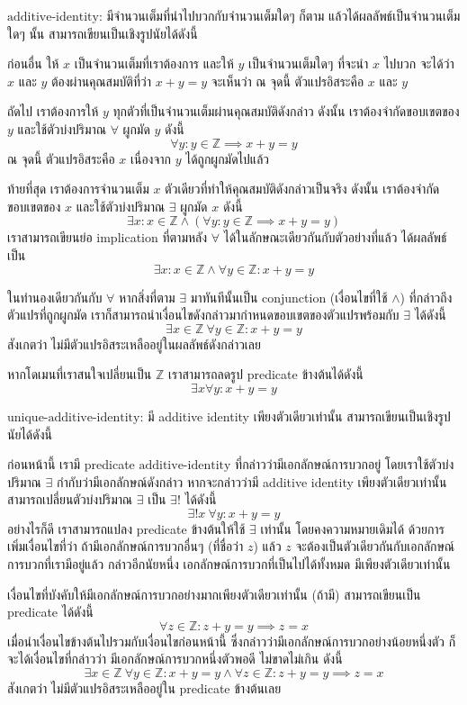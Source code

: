 \begin{example}
$\textrm{additive-identity}$: มีจำนวนเต็มที่นำไปบวกกับจำนวนเต็มใดๆ ก็ตาม แล้วได้ผลลัพธ์เป็นจำนวนเต็มใดๆ นั้น สามารถเขียนเป็นเชิงรูปนัยได้ดังนี้

ก่อนอื่น ให้ $x$ เป็นจำนวนเต็มที่เราต้องการ และให้ $y$ เป็นจำนวนเต็มใดๆ ที่จะนำ $x$ ไปบวก \enskip จะได้ว่า $x$ และ $y$ ต้องผ่านคุณสมบัติที่ว่า $x+y=y$ \enskip จะเห็นว่า ณ จุดนี้ ตัวแปรอิสระคือ $x$ และ $y$

ถัดไป เราต้องการให้ $y$ ทุกตัวที่เป็นจำนวนเต็มผ่านคุณสมบัติดังกล่าว \enskip ดังนั้น เราต้องจำกัดขอบเขตของ $y$ และใช้ตัวบ่งปริมาณ $\forall$ ผูกมัด $y$ ดังนี้ \[\forall y: y\in\mathbb{Z}\implies x+y=y\] ณ จุดนี้ ตัวแปรอิสระคือ $x$ เนื่องจาก $y$ ได้ถูกผูกมัดไปแล้ว

ท้ายที่สุด เราต้องการจำนวนเต็ม $x$ ตัวเดียวที่ทำให้คุณสมบัติดังกล่าวเป็นจริง \enskip ดังนั้น เราต้องจำกัดขอบเขตของ $x$ และใช้ตัวบ่งปริมาณ $\exists$ ผูกมัด $x$ ดังนี้ \[\exists x: x\in\mathbb{Z}\wedge(\forall y: y\in\mathbb{Z}\implies x+y=y)\]
เราสามารถเขียนย่อ implication ที่ตามหลัง $\forall$ ได้ในลักษณะเดียวกันกับตัวอย่างที่แล้ว ได้ผลลัพธ์เป็น \[\exists x: x\in\mathbb{Z}\wedge\forall y\in\mathbb{Z}: x+y=y\]

ในทำนองเดียวกันกับ $\forall$ หากสิ่งที่ตาม $\exists$ มาทันทีนั้นเป็น conjunction (เงื่อนไขที่ใช้ $\wedge$) ที่กล่าวถึงตัวแปรที่ถูกผูกมัด เราก็สามารถนำเงื่อนไขดังกล่าวมากำหนดขอบเขตของตัวแปรพร้อมกับ $\exists$ ได้ดังนี้ \[\exists x\in\mathbb{Z}\ \forall y\in\mathbb{Z}: x+y=y\] สังเกตว่า ไม่มีตัวแปรอิสระเหลืออยู่ในผลลัพธ์ดังกล่าวเลย

หากโดเมนที่เราสนใจเปลี่ยนเป็น $\mathbb{Z}$ เราสามารถลดรูป predicate ข้างต้นได้ดังนี้
\[\exists x\forall y: x+y=y\]
\end{example}

\begin{example}
$\textrm{unique-additive-identity}$: มี additive identity เพียงตัวเดียวเท่านั้น สามารถเขียนเป็นเชิงรูปนัยได้ดังนี้

ก่อนหน้านี้ เรามี predicate $\textrm{additive-identity}$ ที่กล่าวว่ามีเอกลักษณ์การบวกอยู่ โดยเราใช้ตัวบ่งปริมาณ $\exists$ กำกับว่ามีเอกลักษณ์ดังกล่าว \enskip หากจะกล่าวว่ามี additive identity เพียงตัวเดียวเท่านั้น สามารถเปลี่ยนตัวบ่งปริมาณ $\exists$ เป็น $\exists!$ ได้ดังนี้
\[\exists! x\ \forall y: x+y=y\]
อย่างไรก็ดี เราสามารถแปลง predicate ข้างต้นให้ใช้ $\exists$ เท่านั้น โดยคงความหมายเดิมได้ ด้วยการเพิ่มเงื่อนไขที่ว่า ถ้ามีเอกลักษณ์การบวกอื่นๆ (ที่ชื่อว่า $z$) แล้ว $z$ จะต้องเป็นตัวเดียวกันกับเอกลักษณ์การบวกที่เรามีอยู่แล้ว \enskip กล่าวอีกนัยหนึ่ง เอกลักษณ์การบวกที่เป็นไปได้ทั้งหมด มีเพียงตัวเดียวเท่านั้น

เงื่อนไขที่บังคับให้มีเอกลักษณ์การบวกอย่างมากเพียงตัวเดียวเท่านั้น (ถ้ามี) สามารถเขียนเป็น predicate ได้ดังนี้
\[\forall z\in\mathbb{Z}: z+y=y \implies z=x\]
เมื่อนำเงื่อนไขข้างต้นไปรวมกับเงื่อนไขก่อนหน้านี้ ซึ่งกล่าวว่ามีเอกลักษณ์การบวกอย่างน้อยหนึ่งตัว ก็จะได้เงื่อนไขที่กล่าวว่า มีเอกลักษณ์การบวกหนึ่งตัวพอดี ไม่ขาดไม่เกิน ดังนี้
\[\exists x\in\mathbb{Z}\ \forall y\in\mathbb{Z}: x+y=y\wedge\forall z\in\mathbb{Z}: z+y=y \implies z=x\]
สังเกตว่า ไม่มีตัวแปรอิสระเหลืออยู่ใน predicate ข้างต้นเลย
\end{example}

